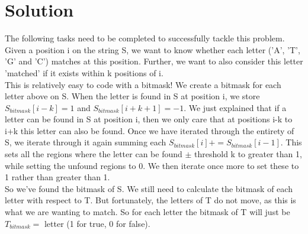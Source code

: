 \documentclass{article}
\begin{document}
\section{Solution}
The following tasks need to be completed to successfully tackle this problem.
Given a position i on the string S, we want to know whether each letter ('A', 'T', 'G' and 'C') matches at this position. Further, we want to also consider this letter 'matched' if it exists within k positions of i. \\
This is relatively easy to code with a bitmask! We create a bitmask for each letter above on S. When the letter is found in S at position i, we store $S_{bitmask}[i-k] = 1$ and $S_{bitmask}[i+k+1] = -1$. We just explained that if a letter can be found in S at position i, then we only care that at positions i-k to i+k this letter can also be found. Once we have iterated through the entirety of S, we iterate through it again summing each $S_{bitmask}[i] += S_{bitmask}[i-1]$. This sets all the regions where the letter can be found $\pm$ threshold k to greater than 1, while setting the unfound regions to 0. We then iterate once more to set these to 1 rather than greater than 1. \\
So we've found the bitmask of S. We still need to calculate the bitmask of each letter with respect to T. But fortunately, the letters of T do not move, as this is what we are wanting to match. So for each letter the bitmask of T will just be $T_{bitmask} = $ letter (1 for true, 0 for false).
\end{document}
